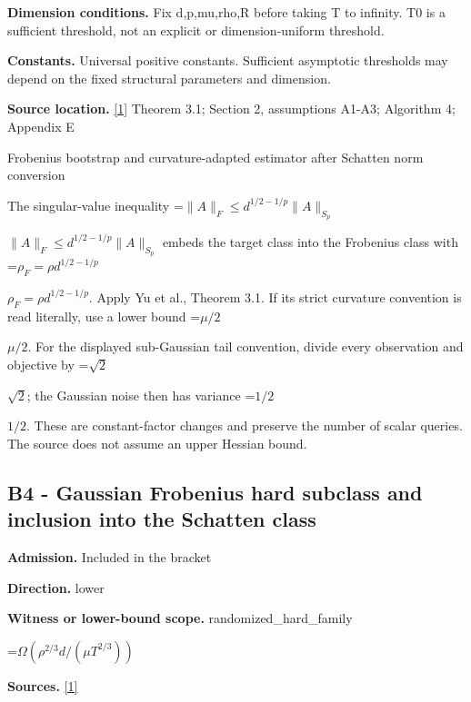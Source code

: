 \documentclass[10pt,a4paper]{article}
\newcommand{\AtlasMath}[1]{\par\begingroup\centering\setbox0=\hbox{$\displaystyle #1$}\ifdim\wd0>1.4\linewidth\typeout{ATLAS WIDE FORMULA: \the\wd0}\fi\ifdim\wd0>\linewidth\resizebox{\linewidth}{!}{\box0}\else\box0\fi\par\endgroup}
\newcommand{\AtlasInlineMath}[1]{\begingroup\setbox0=\hbox{$#1$}\ifdim\wd0>.4\linewidth\endgroup\AtlasMath{#1}\else\endgroup$#1$\fi}
\begin{document}
\textbf{Dimension conditions.} Fix d,p,mu,rho,R before taking T to infinity. T0 is a sufficient threshold, not an explicit or dimension-uniform threshold.



\textbf{Constants.} Universal positive constants. Sufficient asymptotic thresholds may depend on the fixed structural parameters and dimension.



\textbf{Source location.} \href{https://papers.nips.cc/paper_files/paper/2024/file/b444ad72520a5f5c467343be88e352ed-Paper-Conference.pdf}{[1]} Theorem 3.1; Section 2, assumptions A1-A3; Algorithm 4; Appendix E



Frobenius bootstrap and curvature-adapted estimator after Schatten norm conversion



The singular-value inequality \AtlasInlineMath{\|A\|_F\le d^{1/2-1/p}\|A\|_{S_p}} embeds the target class into the Frobenius class with \AtlasInlineMath{\rho_F=\rho d^{1/2-1/p}}. Apply Yu et al., Theorem 3.1. If its strict curvature convention is read literally, use a lower bound \AtlasInlineMath{\mu/2}. For the displayed sub-Gaussian tail convention, divide every observation and objective by \AtlasInlineMath{\sqrt2}; the Gaussian noise then has variance \AtlasInlineMath{1/2}. These are constant-factor changes and preserve the number of scalar queries. The source does not assume an upper Hessian bound.



\subsection{B4 - Gaussian Frobenius hard subclass and inclusion into the Schatten class}


\textbf{Admission.} Included in the bracket



\textbf{Direction.} lower



\textbf{Witness or lower-bound scope.} randomized\_hard\_family



\AtlasMath{\Omega(\rho^{2/3}d/(\mu T^{2/3}))}


\textbf{Sources.} \href{https://papers.nips.cc/paper_files/paper/2024/file/b444ad72520a5f5c467343be88e352ed-Paper-Conference.pdf}{[1]}
\end{document}
